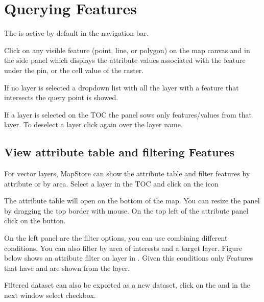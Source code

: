 \documentclass[letterpaper,10pt,english]{sphinxmanual}
\begin{document}
\section{Querying Features}
\label{\detokenize{04_exploring_maps:querying-features}}
\sphinxAtStartPar
The   is active by default in the navigation bar.

\sphinxAtStartPar
Click on any visible feature (point, line, or polygon) on the map canvas and in the side panel which
displays the attribute values associated with the feature under the pin, or the cell value of the raster.

\sphinxAtStartPar
If no layer is selected a dropdown list with all the layer with a feature that intersects the query point is showed.

\sphinxAtStartPar
If a layer is selected on the TOC the panel sows only features/values from that layer.
To deselect a layer click again over the layer name.


\subsection{View attribute table  and filtering Features}
\label{\detokenize{04_exploring_maps:view-attribute-table-and-filtering-features}}\label{\detokenize{04_exploring_maps:filtering-features}}
\sphinxAtStartPar
For vector layers, MapStore can show the attribute table and filter features by attribute or by area.
Select a layer in the TOC and click on the  icon

\sphinxAtStartPar
The attribute table will open on the bottom of the map.
You can resize the panel by dragging the top border with mouse.
On the top left of the attribute panel click on the  button.

\sphinxAtStartPar
On the left panel are the filter options, you can use  combining different conditions.
You can also filter by area of interests and a target layer. Figure below shows an attribute filter
on  layer in .
Given this conditions only Features that have  and  are shown from the layer.

\sphinxAtStartPar
Filtered dataset can also be exported as a new dataset, click on the  
and in the next window select  checkbox.
\end{document}
